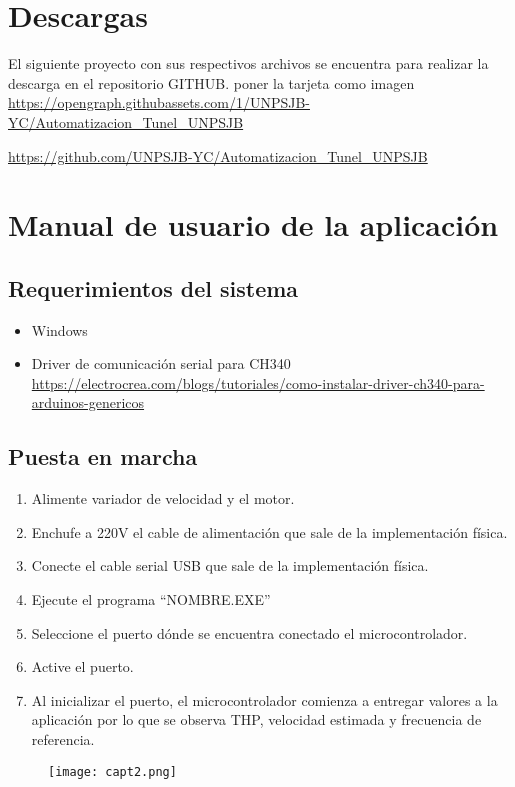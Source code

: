 \section{Descargas}
El siguiente proyecto con sus respectivos archivos se encuentra para realizar la descarga en el repositorio GITHUB.
poner la tarjeta como imagen
\url{https://opengraph.githubassets.com/1/UNPSJB-YC/Automatizacion_Tunel_UNPSJB}

\url{https://github.com/UNPSJB-YC/Automatizacion_Tunel_UNPSJB}
\newpage
\section{Manual de usuario de la aplicación}
\subsection{Requerimientos del sistema}
\begin{itemize}
	\item Windows
	\item Driver de comunicación serial para CH340 \url{https://electrocrea.com/blogs/tutoriales/como-instalar-driver-ch340-para-arduinos-genericos}
\end{itemize}


\subsection{Puesta en marcha}
\begin{enumerate}
	\item Alimente variador de velocidad y el motor.
	\item Enchufe a 220V el cable de alimentación que sale de la implementación física.
	\item Conecte el cable serial USB que sale de la implementación física.
	\item Ejecute el programa “NOMBRE.EXE”
	\item Seleccione el puerto dónde se encuentra conectado el microcontrolador.
	\item Active el puerto.
	\item Al inicializar el puerto, el microcontrolador comienza a entregar valores a la aplicación por lo que se observa THP, velocidad estimada y frecuencia de referencia. 
	
\end{enumerate}

\begin{figure}[H]
	\centering
	\texttt{[image: capt2.png]}
	\label{fig:capt2}
\end{figure}



